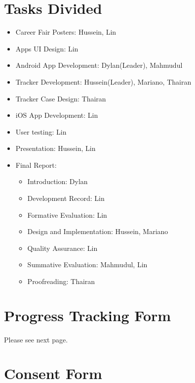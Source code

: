 \documentclass[12pt,a4paper]{article}
\begin{document}
\begin{appendices}
      \section{Tasks Divided}\label{appendix:tasks-divided}
        \begin{itemize}
          \item{Career Fair Posters}: Hussein, Lin
          \item{Apps UI Design}: Lin
          \item{Android App Development}: Dylan(Leader), Mahmudul
          \item{Tracker Development}: Hussein(Leader), Mariano, Thairan
          \item{Tracker Case Design}: Thairan
          \item{iOS App Development}: Lin
          \item{User testing}: Lin
          \item{Presentation}: Hussein, Lin
          \item{Final Report}: 
          \begin{itemize}
            \item{Introduction}: Dylan
            \item{Development Record}: Lin
            \item{Formative Evaluation}: Lin
            \item{Design and Implementation}: Hussein, Mariano
            \item{Quality Assurance}: Lin
            \item{Summative Evaluation}: Mahmudul, Lin
            \item{Proofreading}: Thairan
          \end{itemize}
        \end{itemize}

      \section{Progress Tracking Form}\label{appendix:progress-tracking-form}
        \paragraph{} Please see next page.
        
        
      \section{Consent Form}\label{appendix:consent-form}

\end{appendices}
\end{document}

